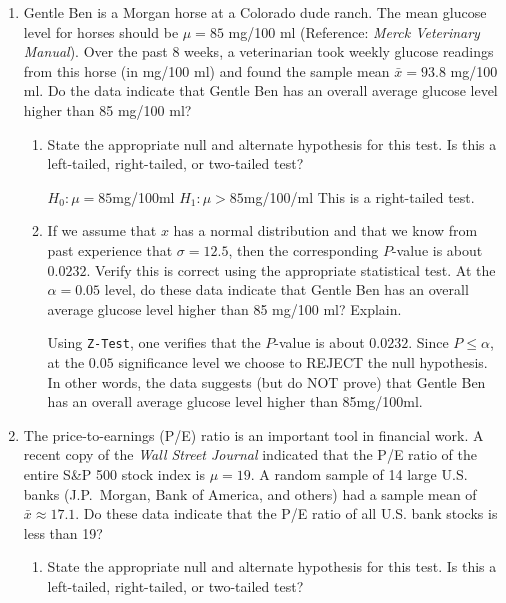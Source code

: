 \begin{enumerate}
\begin{enumerate}
	{\answer $H_1: \mu \neq 16.4$ feet.} 
	 
	
	\item For each of the tests in parts (b), (c), and (d), would the area corresponding to the $P$-value be on the left, on the right, or on both sides of the mean? Explain your answer in each case. 
	
	{\answer (b) Right; (c) Left; (d) Both Sides.  
	That is, for (b), we use a right-tailed test; for (c), we use a left-tailed test; and for (d), we use a two-tailed test.} 
	 

	\end{enumerate}

\vfill

\newpage
\item Gentle Ben is a Morgan horse at a Colorado dude ranch. The mean glucose level for horses should be $\mu = 85$ mg/100 ml (Reference: {\em Merck Veterinary Manual}). Over the past 8 weeks, a veterinarian took weekly glucose readings from this horse (in mg/100 ml) and found the sample mean $\bar{x} = 93.8$ mg/100 ml. Do the data indicate that Gentle Ben has an overall average glucose level higher than 85 mg/100 ml?
	\begin{enumerate}
	\item State the appropriate null and alternate hypothesis for this test. Is this a left-tailed, right-tailed, or two-tailed test? 
	
	{\answer $H_0: \mu = 85$mg/100ml 
	$H_1: \mu > 85$mg/100/ml 
	This is a right-tailed test. } 
	
	\item If we assume that $x$ has a normal distribution and that we know from past experience that $\sigma = 12.5$, then the corresponding $P$-value is about $0.0232$. Verify this is correct using the appropriate statistical test. At the $\alpha = 0.05$ level, do these data indicate that Gentle Ben has an overall average glucose level higher than 85 mg/100 ml? Explain. 
	
	{\answer Using \texttt{Z-Test}, one verifies that the $P$-value is about $0.0232$. Since $P\leq \alpha$, at the $0.05$ significance level we choose to REJECT the null hypothesis. In other words, the data suggests (but do NOT prove) that Gentle Ben has an overall average glucose level higher than 85mg/100ml.} 
	
	\end{enumerate}

\vfill

\item The price-to-earnings (P/E) ratio is an important tool in financial work. A recent copy of the {\em Wall Street Journal} indicated that the P/E ratio of the entire S\&P 500 stock index is $\mu = 19$. A random sample of 14 large U.S. banks (J.P.\ Morgan, Bank of America, and others) had a sample mean of $\bar{x} \approx 17.1$. Do these data indicate that the P/E ratio of all U.S. bank stocks is less than 19?
	\begin{enumerate}
	\item State the appropriate null and alternate hypothesis for this test. Is this a left-tailed, right-tailed, or two-tailed test? 
	

\end{enumerate}
\end{enumerate}
